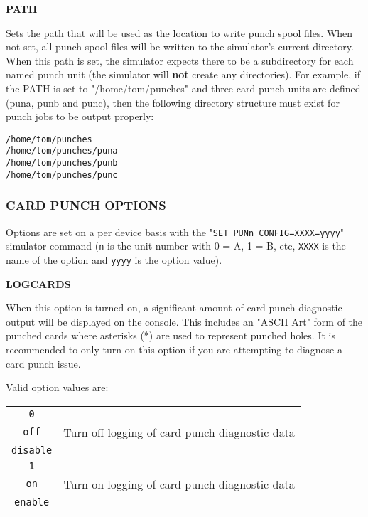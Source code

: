\textbf{PATH}

\begin{adjustwidth}{5ex}{1ex}
    Sets the path that will be used as the location to write punch spool files. When not set, all punch spool files will be written
    to the simulator's current directory. When this path is set, the simulator expects there to be a subdirectory for each named punch
    unit (the simulator will \textbf{not} create any directories).  For example, if the PATH is set to "/home/tom/punches" and three
    card punch units are defined (puna, punb and punc), then the following directory structure must exist for punch jobs to be output properly:

    \begin{adjustwidth}{5ex}{1ex}
        \texttt{/home/tom/punches} \\
        \texttt{/home/tom/punches/puna} \\
        \texttt{/home/tom/punches/punb} \\
        \texttt{/home/tom/punches/punc} \\
    \end{adjustwidth}
\end{adjustwidth}

\subsubsection[Card Punch Options]{CARD PUNCH OPTIONS}

Options are set on a per device basis with the "\texttt{SET PUNn CONFIG=XXXX=yyyy}" simulator command (\texttt{n} is the unit number with 0 = A, 1 = B, etc,
\texttt{XXXX} is the name of the option and \texttt{yyyy} is the option value).

\textbf{LOGCARDS}

\begin{adjustwidth}{5ex}{1ex}
    When this option is turned on, a significant amount of card punch diagnostic output will be displayed on the console. This includes
    an "ASCII Art" form of the punched cards where asterisks (*) are used to represent punched holes. It is recommended to only turn on
    this option if you are attempting to diagnose a card punch issue.

    Valid option values are:

    \begin{adjustwidth}{5ex}{1ex}
        \begin{tabular}{cc}
            \hline
            \texttt{0}  & \\
            \texttt{off} & Turn off logging of card punch diagnostic data \\
            \texttt{disable} & \\
            \hline
            \texttt{1} & \\
            \texttt{on} & Turn on logging of card punch diagnostic data \\
            \texttt{enable} & \\
            \hline
        \end{tabular}
    \end{adjustwidth}
\end{adjustwidth}

